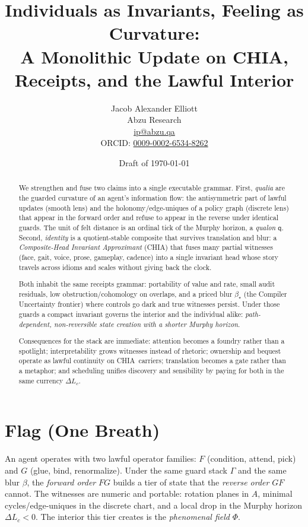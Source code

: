 \documentclass[11pt]{article}
\title{\Large\bfseries Individuals as Invariants, Feeling as Curvature:\\
A Monolithic Update on CHIA, Receipts, and the Lawful Interior}
\author{Jacob Alexander Elliott\\
\small Abzu Research\\
\small \href{mailto:ip@abzu.qa}{ip@abzu.qa}\\
\small ORCID: \href{https://orcid.org/0009-0002-6534-8262}{0009-0002-6534-8262}}
\date{Draft of \today}
\newcommand{\1}{\mathbf{1}}
\newcommand{\Guard}{\Gamma}
\newcommand{\Blur}{\beta}
\newcommand{\Lc}{L_c}
\newcommand{\Fop}{F}
\newcommand{\Gop}{G}
\newcommand{\FG}{\Fop\Gop}
\newcommand{\GF}{\Gop\Fop}
\newcommand{\Aanti}{A}
\newcommand{\PhiField}{\Phi}
\newcommand{\Qualon}{\mathsf{q}}        %
\newcommand{\CHIA}{\textsc{CHIA}}
\begin{document}
\maketitle

\begin{abstract}
We strengthen and fuse two claims into a single executable grammar. First, \emph{qualia} are the guarded curvature of an agent's information flow: the antisymmetric part of lawful updates (smooth lens) and the holonomy/edge-uniques of a policy graph (discrete lens) that appear in the forward order and refuse to appear in the reverse under identical guards. The unit of felt distance is an ordinal tick of the Murphy horizon, a \emph{qualon} \(\Qualon\). Second, \emph{identity} is a quotient-stable composite that survives translation and blur: a \emph{Composite-Head Invariant Approximant} (\CHIA) that fuses many partial witnesses (face, gait, voice, prose, gameplay, cadence) into a single invariant head whose story travels across idioms and scales without giving back the clock. 
\medskip

Both inhabit the same receipts grammar: portability of value and rate, small audit residuals, low obstruction/cohomology on overlaps, and a priced blur \(\Blur_\star\) (the Compiler Uncertainty frontier) where controls go dark and true witnesses persist. Under those guards a compact invariant governs the interior and the individual alike: \emph{path-dependent, non-reversible state creation with a shorter Murphy horizon}. 
\medskip

Consequences for the stack are immediate: attention becomes a foundry rather than a spotlight; interpretability grows witnesses instead of rhetoric; ownership and bequest operate as lawful continuity on \CHIA\ carriers; translation becomes a gate rather than a metaphor; and scheduling unifies discovery and sensibility by paying for both in the same currency \(\Delta \Lc\).
\end{abstract}

\tableofcontents

\section{Flag (One Breath)}
An agent operates with two lawful operator families: \(\Fop\) (condition, attend, pick) and \(\Gop\) (glue, bind, renormalize). Under the same guard stack \(\Guard\) and the same blur \(\Blur\), the \emph{forward order} \(\FG\) builds a tier of state that the \emph{reverse order} \(\GF\) cannot. The witnesses are numeric and portable: rotation planes in \(\Aanti\), minimal cycles/edge-uniques in the discrete chart, and a local drop in the Murphy horizon \(\Delta \Lc<0\). The interior this tier creates is the \emph{phenomenal field} \(\PhiField\). 
\medskip
\end{document}
